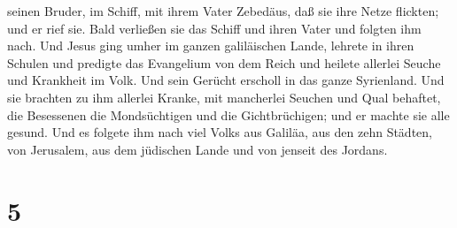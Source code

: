 seinen Bruder, im Schiff, mit ihrem Vater Zebedäus, daß sie ihre Netze
flickten; und er rief sie.  Bald verließen sie das Schiff
und ihren Vater und folgten ihm nach.  Und Jesus ging umher
im ganzen galiläischen Lande, lehrete in ihren Schulen und predigte das
Evangelium von dem Reich und heilete allerlei Seuche und Krankheit im
Volk.  Und sein Gerücht erscholl in das ganze Syrienland.
Und sie brachten zu ihm allerlei Kranke, mit mancherlei Seuchen und Qual
behaftet, die Besessenen die Mondsüchtigen und die Gichtbrüchigen; und
er machte sie alle gesund.  Und es folgete ihm nach viel
Volks aus Galiläa, aus den zehn Städten, von Jerusalem, aus dem
jüdischen Lande und von jenseit des Jordans.

\hypertarget{section-4}{%
\section{5}\label{section-4}}

